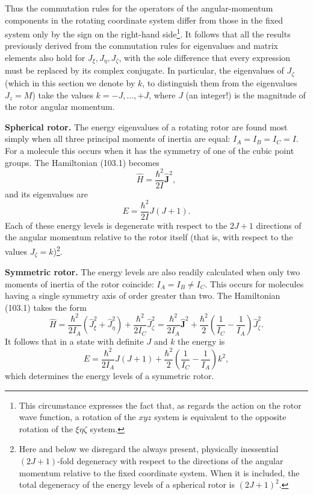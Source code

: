 Thus the commutation rules for the operators of the angular-momentum components in the rotating coordinate system differ from those in the fixed system only by the sign on the right-hand side\footnote{This circumstance expresses the fact that, as regards the action on the rotor wave function, a rotation of the $xyz$ system is equivalent to the opposite rotation of the $\xi\eta\zeta$ system.}. It follows that all the results previously derived from the commutation rules for eigenvalues and matrix elements also hold for $J_\xi,J_\eta,J_\zeta$, with the sole difference that every expression must be replaced by its complex conjugate. In particular, the eigenvalues of $J_\zeta$ (which in this section we denote by $k$, to distinguish them from the eigenvalues $J_z=M$) take the values $k=-J,\ldots,+J$, where $J$ (an integer!) is the magnitude of the rotor angular momentum.

\textbf{Spherical rotor.} The energy eigenvalues of a rotating rotor are found most simply when all three principal moments of inertia are equal: $I_A=I_B=I_C=I$. For a molecule this occurs when it has the symmetry of one of the cubic point groups. The Hamiltonian (103.1) becomes
\[
 \hat H=\frac{\hbar^2}{2I}\hat{\mathbf J}^{2},
\]
and its eigenvalues are
\begin{equation}
 E=\frac{\hbar^2}{2I}J(J+1). \tag{103.4}
\end{equation}
Each of these energy levels is degenerate with respect to the $2J+1$ directions of the angular momentum relative to the rotor itself (that is, with respect to the values $J_\zeta=k$)\footnote{Here and below we disregard the always present, physically inessential $(2J+1)$-fold degeneracy with respect to the directions of the angular momentum relative to the fixed coordinate system. When it is included, the total degeneracy of the energy levels of a spherical rotor is $(2J+1)^2$.}.

\textbf{Symmetric rotor.} The energy levels are also readily calculated when only two moments of inertia of the rotor coincide: $I_A=I_B\ne I_C$. This occurs for molecules having a single symmetry axis of order greater than two. The Hamiltonian (103.1) takes the form
\begin{equation}
 \hat H=\frac{\hbar^2}{2I_A}(\hat J_\xi^2+\hat J_\eta^2)+\frac{\hbar^2}{2I_C}\hat J_\zeta^2
 =\frac{\hbar^2}{2I_A}\hat{\mathbf J}^{2}+\frac{\hbar^2}{2}\left(\frac1{I_C}-\frac1{I_A}\right)\hat J_\zeta^2. \tag{103.5}
\end{equation}
It follows that in a state with definite $J$ and $k$ the energy is
\begin{equation}
 E=\frac{\hbar^2}{2I_A}J(J+1)+\frac{\hbar^2}{2}\left(\frac1{I_C}-\frac1{I_A}\right)k^2, \tag{103.6}
\end{equation}
which determines the energy levels of a symmetric rotor.

